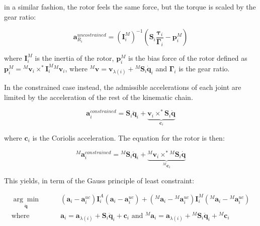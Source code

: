 in a similar fashion, the rotor feels the same force, but the torque is scaled by the gear ratio:

\begin{equation}
    \mathbf{a} ^{uncostrained} _{R _i} = (\mathbf{I} ^M _i) ^{-1}(\mathbf{S} _i \frac{\boldsymbol{\tau} _i}{\boldsymbol{\Gamma} _i} - \mathbf{p} ^M _i)
\end{equation}

where $\mathbf{I} ^M _i$ is the inertia of the rotor, $\mathbf{p} ^M _i$ is the bias force of the rotor defined as $\mathbf{p} ^M _i = {} ^M \mathbf{v} _i\times ^* \mathbf{I} ^M _i {} ^M \mathbf{v} _i$, where ${} ^M \mathbf{v} = \mathbf{v} _{\lambda (i)} + {} ^M \mathbf{S} _i \dot{\mathbf{q}} _i$ and $\boldsymbol{\Gamma} _i$ is the gear ratio.

In the constrained case instead, the admissible accelerations of each joint are limited by the acceleration of the rest of the kinematic chain.

\begin{equation}
    \mathbf{a} ^{constrained} _i = \mathbf{S} _i \ddot{\mathbf{q}} _i + \underbrace{\mathbf{v} _i \times ^* \mathbf{S} _i \dot{\mathbf{q}}} _{\mathbf{c} _i}
\end{equation}

where $\mathbf{c} _i$ is the Coriolis acceleration. The equation for the rotor is then:

\begin{equation}
    {} ^M \mathbf{a} ^{constrained} _i = {} ^M \mathbf{S} _i \ddot{\mathbf{q}} _i + \underbrace{{} ^M \mathbf{v} _i \times ^* {} ^M\mathbf{S} _i \dot{\mathbf{q}}} _{{} ^M \mathbf{c} _i}
\end{equation}

This yields, in term of the Gauss principle of least constraint:

\begin{align}
    \underset{\ddot{\mathbf{q}}}{\arg \min} & \qquad (\mathbf{a} _i - \mathbf{a} _i ^{uc}) \mathbf{I} ^A _i (\mathbf{a} _i - \mathbf{a} _i ^{uc}) + ({} ^M \mathbf{a} _i - {} ^M \mathbf{a} _i ^{uc}) \mathbf{I} ^M _i ({} ^M \mathbf{a} _i - {} ^M \mathbf{a} _i ^{uc}) \nonumber           \\
    \text{where }                           & \qquad \mathbf{a} _i = \mathbf{a} _{\lambda (i)} + \mathbf{S} _i \ddot{\mathbf{q}} _i + \mathbf{c} _i \text{ and } {} ^M \mathbf{a} _i = \mathbf{a} _{\lambda (i)} + {} ^M  \mathbf{S} _i \ddot{\mathbf{q}} _i + {} ^M \mathbf{c} _i \nonumber \\
\end{align}

